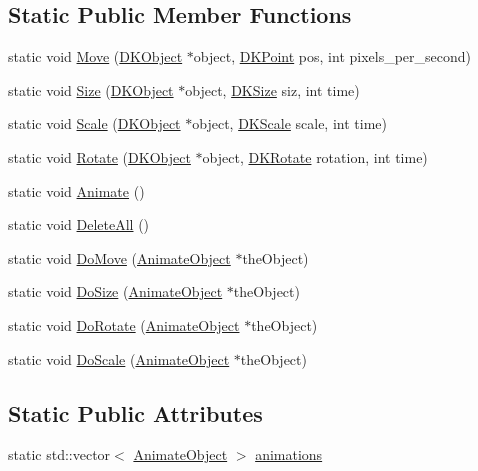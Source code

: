 \subsection*{Static Public Member Functions}
\begin{DoxyCompactItemize}
\item 
static void \hyperlink{class_d_k_animate_a0e22f5da0c9398f34307b6bafd6fd22d}{Move} (\hyperlink{class_d_k_object}{D\-K\-Object} $\ast$object, \hyperlink{_d_k_axis_8h_a0ca1f005fbb936f8e7a7f2433591f418}{D\-K\-Point} pos, int pixels\-\_\-per\-\_\-second)
\item 
static void \hyperlink{class_d_k_animate_aa726a9d2d3773ea8ce698a872382e7ee}{Size} (\hyperlink{class_d_k_object}{D\-K\-Object} $\ast$object, \hyperlink{_d_k_axis_8h_aaa25a8c7cbf504fffdb8a4208ff7a731}{D\-K\-Size} siz, int time)
\item 
static void \hyperlink{class_d_k_animate_a0deca053944bc19a991130caf9870659}{Scale} (\hyperlink{class_d_k_object}{D\-K\-Object} $\ast$object, \hyperlink{_d_k_axis_8h_ab9e555d97d32f68d4c77474d1e1ba787}{D\-K\-Scale} scale, int time)
\item 
static void \hyperlink{class_d_k_animate_a97ba0ee005b7fa2f890c007c840f5c89}{Rotate} (\hyperlink{class_d_k_object}{D\-K\-Object} $\ast$object, \hyperlink{_d_k_axis_8h_a886498401ce03ee3a95cb58785ab475a}{D\-K\-Rotate} rotation, int time)
\item 
static void \hyperlink{class_d_k_animate_a0c53852179d726e0e6481f07ebcd897f}{Animate} ()
\item 
static void \hyperlink{class_d_k_animate_ae1de28633360b3d6e0419f88f109047e}{Delete\-All} ()
\item 
static void \hyperlink{class_d_k_animate_a1941e8421a723fe005a3ef5441c3e4fa}{Do\-Move} (\hyperlink{struct_animate_object}{Animate\-Object} $\ast$the\-Object)
\item 
static void \hyperlink{class_d_k_animate_a27acb3765eab43e593f59402284c141d}{Do\-Size} (\hyperlink{struct_animate_object}{Animate\-Object} $\ast$the\-Object)
\item 
static void \hyperlink{class_d_k_animate_a12070504d6f16c551b7ae467485cef02}{Do\-Rotate} (\hyperlink{struct_animate_object}{Animate\-Object} $\ast$the\-Object)
\item 
static void \hyperlink{class_d_k_animate_ab88cf1f618ea39207e47b3d64c9cc09c}{Do\-Scale} (\hyperlink{struct_animate_object}{Animate\-Object} $\ast$the\-Object)
\end{DoxyCompactItemize}
\subsection*{Static Public Attributes}
\begin{DoxyCompactItemize}
\item 
static std\-::vector$<$ \hyperlink{struct_animate_object}{Animate\-Object} $>$ \hyperlink{class_d_k_animate_a24cf1a5c5d0cfe2b4596c492b50165ec}{animations}
\end{DoxyCompactItemize}


